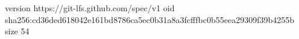 version https://git-lfs.github.com/spec/v1
oid sha256:cd36ded618042e161bd8786ca5ec0b31a8a3fcfffbc0b55eea29309f39b4255b
size 54
